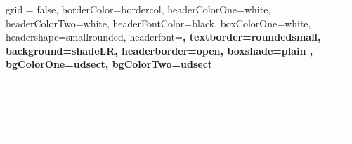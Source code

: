 \documentclass[a0paper,portrait]{baposter}
\begin{document}

\begin{poster}{
grid = false,
borderColor=bordercol, %
headerColorOne=white, %
headerColorTwo=white, %
headerFontColor=black, %
boxColorOne=white, %
headershape=smallrounded, %
headerfont=\Large\sf\bf, %
textborder=roundedsmall,
background=shadeLR, %
headerborder=open, %
boxshade=plain , %
bgColorOne=udsect,
bgColorTwo=udsect
}
{}
%
%
{\sf \bf \huge \textcolor{white}{\textsc{Quantifying LD decay by quantile regression \\[0.25em] a case study }}} %
{\vspace{0.8em}  \textcolor{white}{\textsc{Sabine K.Schnabel$^{1}$, Federico Torretta$^{2}$ and Matthias Westhues$^{3}$}}\\ %
{\small \textcolor{white}{1: Biometris, Wageningen University and Research Centre, The Netherlands; 
2: Universit\`a di Palermo, Italy; 3: Universit\"at Hohenheim, Germany }}} %





\end{poster}
\end{document}
